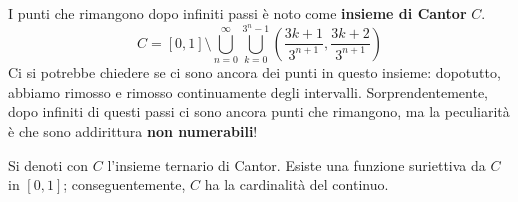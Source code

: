 I punti che rimangono dopo infiniti passi è noto come \textbf{insieme di Cantor} $C$.
\begin{equation*}
	C=\left[0,1\right]\setminus\bigcup_{n=0}^\infty \bigcup_{k=0}^{3^n-1} \left(\frac{3k+1}{3^{n+1}},\frac{3k+2}{3^{n+1}}\right)
\end{equation*}
Ci si potrebbe chiedere se ci sono ancora dei punti in questo insieme: dopotutto, abbiamo rimosso e rimosso continuamente degli intervalli. Sorprendentemente, dopo infiniti di questi passi ci sono ancora punti che rimangono, ma la peculiarità è che sono addirittura \textbf{non numerabili}!
\begin{theorema}
	Si denoti con $C$ l'insieme ternario di Cantor. Esiste una funzione suriettiva da $C$ in $\left[0,1\right]$; conseguentemente, $C$ ha la cardinalità del continuo.
\end{theorema}
